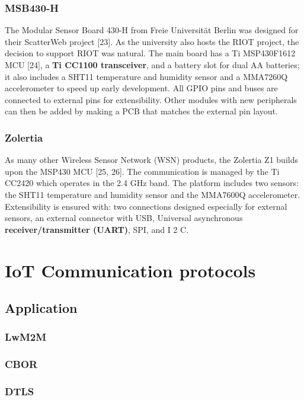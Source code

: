 \subsubsection{MSB430-H}

The Modular Sensor Board 430-H from Freie Universität Berlin was designed for their ScatterWeb project [23].
As the university also hosts the RIOT project,
	the decision to support RIOT was natural.
The main board has a Ti MSP430F1612 MCU [24],
	a \textbf{Ti CC1100 transceiver},
	and a battery slot for dual AA batteries;
	it also includes a SHT11 temperature and humidity sensor and a MMA7260Q accelerometer to speed up early development.
All GPIO pins and buses are connected to external pins for extensibility.
Other modules with new peripherals can then be added by making a PCB that matches the external pin layout.

\subsubsection{Zolertia}

As many other Wireless Sensor Network (WSN) products,
	the Zolertia Z1 builds upon the MSP430 MCU [25, 26].
The communication is managed by the Ti CC2420 which operates in the 2.4 GHz band.
The platform includes two sensors:
	the SHT11 temperature and humidity sensor and the MMA7600Q accelerometer.
Extensibility is ensured with:
	two connections designed especially for external sensors,
	an external connector with USB,
	Universal asynchronous \textbf{receiver/transmitter (UART)},
	SPI,
	and I 2 C.


\section{IoT Communication protocols}


\subsection{Application}


\subsubsection{LwM2M}
\subsubsection{CBOR}
\subsubsection{DTLS}
